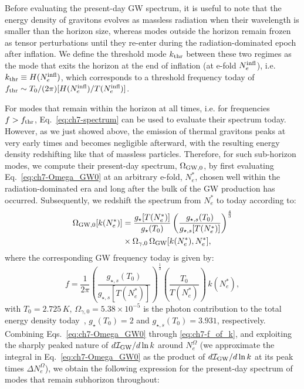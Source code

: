Before evaluating the present-day GW spectrum, it is useful to note that the energy density of gravitons evolves as massless radiation when their wavelength is smaller than the horizon size, whereas modes outside the horizon remain frozen as tensor perturbations until they re-enter during the radiation-dominated epoch after inflation. We define the threshold mode $k_{\rm thr}$ between these two regimes as the mode that exits the horizon at the end of inflation (at e-fold $N_e^{\rm infl}$), i.e. $k_{\rm thr}\equiv H(N_e^{\rm infl})$, which corresponds to a threshold frequency today of $f_{\rm thr}\sim T_0/(2\pi)[H(N_e^{\rm infl})/T(N^{\rm infl}_{e})]$.

For modes that remain within the horizon at all times, i.e. for frequencies $f>f_{\rm thr}$, Eq.~\eqref{eq:ch7-spectrum} can be used to evaluate their spectrum today. However, as we just showed above, the emission of thermal gravitons peaks at very early times and becomes negligible afterward, with the resulting energy density redshifting like that of massless particles. Therefore, for such sub-horizon modes, we compute their present-day spectrum, $\Omega_{\rm GW,0}$, by first evaluating Eq.~\eqref{eq:ch7-Omega_GW0} at an arbitrary e-fold, $N^*_{e}$, chosen well within the radiation-dominated era and long after the bulk of the GW production has occurred. Subsequently, we redshift the spectrum from $N^*_{e}$ to today according to:
\begin{align}
\nonumber \Omega_{\rm GW,0}[k(N^*_{e})]&=\frac{g_{\star}[T(N^*_{e})]}{g_\star(T_0)}\left(\frac{g_{\star,s}(T_0)}{g_{\star,s}[T(N^*_{e})]}\right)^{\frac{4}{3}}\\
    &\times\Omega_{\gamma,0} \,\Omega_{\rm GW}[k(N^*_{e}), N^*_{e}], \label{eq:ch7-Omega_GW0_v2}
\end{align}
where the corresponding GW frequency today is given by:
\begin{equation}
    f=\frac{1}{2\pi}\left(\frac{g_{\star,s}(T_0)}{g_{\star,s}[T(N^*_{e})]}\right)^{\frac{1}{3}}\left(\frac{T_0}{T(N^*_{e})}\right)\,k(N^*_{e}), \label{eq:ch7-f_of_k}
\end{equation}
with  $T_0=2.725\,K$, $\Omega_{\gamma,0}=5.38\times 10^{-5}$ is the photon contribution to the total energy density today~\cite{Planck:2018vyg}, $g_\star(T_0)=2$ and $g_{\star, s}(T_0)=3.931$, respectively.
Combining Eqs.~\eqref{eq:ch7-Omega_GW0} through \eqref{eq:ch7-f_of_k}, and exploiting the sharply peaked nature of $d\mathcal{I}_{\rm GW}/d\ln k$ around $N_e^{\Omega}$ (we approximate the integral in Eq.~\eqref{eq:ch7-Omega_GW0} as the product of $d\mathcal{I}_{\rm GW}/d\ln k$ at its peak times $\Delta N_e^\Omega$), we obtain the following expression for the present-day spectrum of modes that remain subhorizon throughout:
